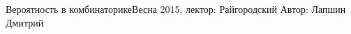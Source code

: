 

\renewcommand{\thesection}{\arabic{section}}


\BigHeader
	{Вероятность в комбинаторике}{Весна 2015, лектор: Райгородский}
	{Автор: Лапшин Дмитрий}
	
 


